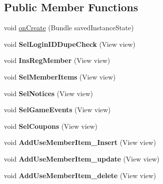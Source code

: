 \subsection*{Public Member Functions}
\begin{DoxyCompactItemize}
\item 
void \hyperlink{a00186_abb20286c255c8ea2939122541df38985}{on\+Create} (Bundle saved\+Instance\+State)
\item 
void {\bfseries Sel\+Login\+I\+D\+Dupe\+Check} (View view)\hypertarget{a00186_a0e1ff0d84630d8c83e35412361a099b1}{}\label{a00186_a0e1ff0d84630d8c83e35412361a099b1}

\item 
void {\bfseries Ins\+Reg\+Member} (View view)\hypertarget{a00186_a746c167231c4e9d971904c9ae4578ed0}{}\label{a00186_a746c167231c4e9d971904c9ae4578ed0}

\item 
void {\bfseries Sel\+Member\+Items} (View view)\hypertarget{a00186_ad77e9fb8a8e12b98efb73a037de138db}{}\label{a00186_ad77e9fb8a8e12b98efb73a037de138db}

\item 
void {\bfseries Sel\+Notices} (View view)\hypertarget{a00186_a565e49579a8cc90c28730d9766043b2b}{}\label{a00186_a565e49579a8cc90c28730d9766043b2b}

\item 
void {\bfseries Sel\+Game\+Events} (View view)\hypertarget{a00186_aeb85177229ff1d083494ce73116aef4e}{}\label{a00186_aeb85177229ff1d083494ce73116aef4e}

\item 
void {\bfseries Sel\+Coupons} (View view)\hypertarget{a00186_a256e90cfedcf49fdca4dff34fb854cf9}{}\label{a00186_a256e90cfedcf49fdca4dff34fb854cf9}

\item 
void {\bfseries Add\+Use\+Member\+Item\+\_\+\+Insert} (View view)\hypertarget{a00186_ac3a16e262c662396c032eeea7fe3f8c9}{}\label{a00186_ac3a16e262c662396c032eeea7fe3f8c9}

\item 
void {\bfseries Add\+Use\+Member\+Item\+\_\+update} (View view)\hypertarget{a00186_a30881bd4f389d6c848207bebf02904b0}{}\label{a00186_a30881bd4f389d6c848207bebf02904b0}

\item 
void {\bfseries Add\+Use\+Member\+Item\+\_\+delete} (View view)\hypertarget{a00186_af867d3d5ada3e5086e5fbb4c8a1d8906}{}\label{a00186_af867d3d5ada3e5086e5fbb4c8a1d8906}

\end{DoxyCompactItemize}


